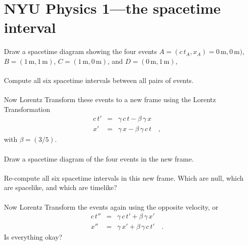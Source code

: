 \documentclass[12pt]{article}
\newcommand{\m}{\mathrm{m}}
\newcounter{problem}
\begin{document}
\sloppy\sloppypar\raggedbottom\frenchspacing\thispagestyle{empty}

\section*{NYU Physics 1---the spacetime interval}

\paragraph{\theproblem}%
Draw a spacetime diagram showing the four events
$A=(c\,t_A,x_A)=0\,\m,0\,\m)$, $B=(1\,\m,1\,\m)$, $C=(1\,\m,0\,\m)$,
and $D=(0\,\m,1\,\m)$,

\paragraph{\theproblem}%
Compute all six spacetime intervals between all pairs of events.

\paragraph{\theproblem}%
Now Lorentz Transform these events to a new frame using the Lorentz
Transformation
\begin{eqnarray}\displaystyle
c\,t' & = & \gamma\,c\,t - \beta\,\gamma\,   x \nonumber\\
   x' & = & \gamma\,   x - \beta\,\gamma\,c\,t \quad ,
\end{eqnarray}
with $\beta=(3/5)$.

\paragraph{\theproblem}%
Draw a spacetime diagram of the four events in the new frame.

\paragraph{\theproblem}%
Re-compute all six spacetime intervals in this new frame.  Which are
null, which are spacelike, and which are timelike?

\paragraph{\theproblem}%
Now Lorentz Transform the events again using the opposite velocity, or
\begin{eqnarray}\displaystyle
c\,t'' & = & \gamma\,c\,t' + \beta\,\gamma\,   x' \nonumber\\
   x'' & = & \gamma\,   x' + \beta\,\gamma\,c\,t' \quad .
\end{eqnarray}
Is everything okay?
\end{document}
